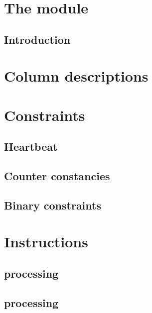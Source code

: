 
\section{The \rlpUtilsMod{} module}
\subsection{Introduction}                    \label{rlp utils: introduction}                          

\section{Column descriptions}                \label{rlp utils: column descriptions}                   

\section{Constraints}                        \label{rlp utils: constraints}
\subsection{Heartbeat}                       \label{rlp utils: constraints: heartbeat}                
\subsection{Counter constancies}             \label{rlp utils: constraints: constancies}              
\subsection{Binary constraints}              \label{rlp utils: constraints: binarities}               

\section{Instructions}                       \label{rlp utils: instructions}
\subsection{ processing}       \label{rlp utils: instructions: integer processing}      
\subsection{ processing}    \label{rlp utils: instructions: byte string processing}  

